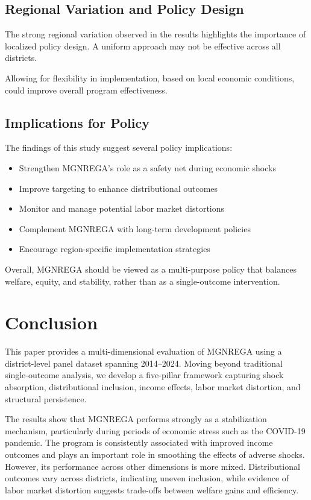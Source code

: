 \documentclass[12pt]{article}
\begin{document}
\subsection{Regional Variation and Policy Design}

The strong regional variation observed in the results highlights the importance of localized policy design. A uniform approach may not be effective across all districts.

Allowing for flexibility in implementation, based on local economic conditions, could improve overall program effectiveness.

\subsection{Implications for Policy}

The findings of this study suggest several policy implications:

\begin{itemize}
\item Strengthen MGNREGA’s role as a safety net during economic shocks
\item Improve targeting to enhance distributional outcomes
\item Monitor and manage potential labor market distortions
\item Complement MGNREGA with long-term development policies
\item Encourage region-specific implementation strategies
\end{itemize}

Overall, MGNREGA should be viewed as a multi-purpose policy that balances welfare, equity, and stability, rather than as a single-outcome intervention.


\section{Conclusion}

This paper provides a multi-dimensional evaluation of MGNREGA using a district-level panel dataset spanning 2014–2024. Moving beyond traditional single-outcome analysis, we develop a five-pillar framework capturing shock absorption, distributional inclusion, income effects, labor market distortion, and structural persistence.

The results show that MGNREGA performs strongly as a stabilization mechanism, particularly during periods of economic stress such as the COVID-19 pandemic. The program is consistently associated with improved income outcomes and plays an important role in smoothing the effects of adverse shocks. However, its performance across other dimensions is more mixed. Distributional outcomes vary across districts, indicating uneven inclusion, while evidence of labor market distortion suggests trade-offs between welfare gains and efficiency.
\end{document}
